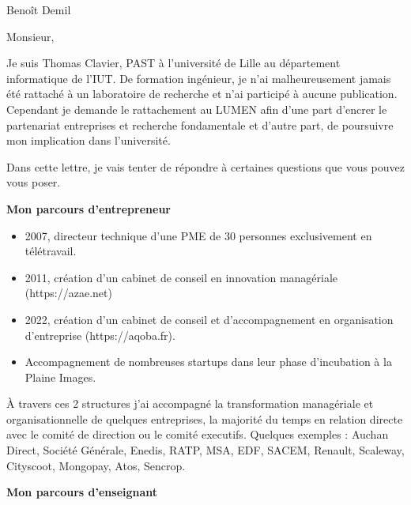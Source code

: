 \documentclass{lettre}
\begin{document}
\begin{letter}{ Benoît Demil }

    \address{\textsc{Thomas Clavier}\\45 rue d'Inkermann\\59100 Roubaix}
    \nofax

    \makeatletter
    \def\rule@length{0}
    \makeatother


    \signature{Thomas Clavier}

    \opening{Monsieur,}

    Je suis Thomas Clavier, PAST à l'université de Lille au département informatique de l'IUT. De formation ingénieur, je n'ai malheureusement jamais été rattaché à un laboratoire de recherche et n'ai participé à aucune publication. Cependant je demande le rattachement au LUMEN afin d'une part d'encrer le partenariat entreprises et recherche fondamentale et d'autre part, de poursuivre mon implication dans l'université.

    Dans cette lettre, je vais tenter de répondre à certaines questions que vous pouvez vous poser.

    \textbf{Mon parcours d'entrepreneur}

    \begin{itemize}
        \item 2007, directeur technique d'une PME de 30 personnes exclusivement en télétravail.
        \item 2011, création d'un cabinet de conseil en innovation managériale (https://azae.net)
        \item 2022, création d'un cabinet de conseil et d'accompagnement en organisation d'entreprise (https://aqoba.fr).
        \item Accompagnement de nombreuses startups dans leur phase d'incubation à la Plaine Images.
    \end{itemize}

    À travers ces 2 structures j'ai accompagné la transformation managériale et organisationnelle de quelques entreprises, la majorité du temps en relation directe avec le comité de direction ou le comité executifs. Quelques exemples : Auchan Direct, Société Générale, Enedis, RATP, MSA, EDF, SACEM, Renault, Scaleway, Cityscoot, Mongopay, Atos, Sencrop.

    \textbf{Mon parcours d'enseignant}


\end{letter}
\end{document}
